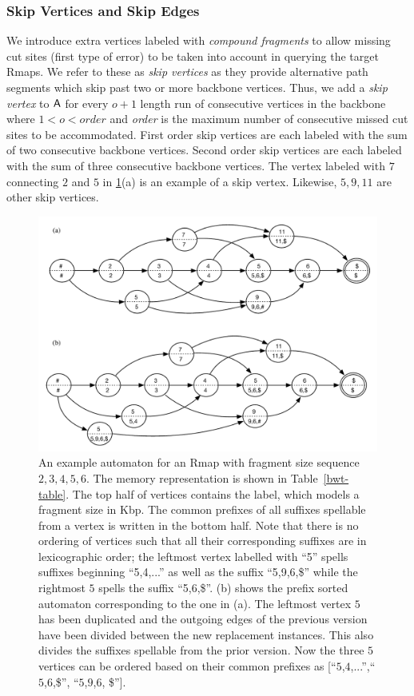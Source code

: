 \subsubsection{Skip Vertices and Skip Edges}
We introduce extra vertices labeled with {\em compound fragments} to allow missing cut sites (first type of error) to be taken into account in querying the target Rmaps.  We refer to these as {\em skip vertices} as they provide alternative path segments which skip past two or more backbone vertices. Thus, we add a {\em skip vertex} to $\mathsf{A}$ for every $o+1$ length run of consecutive vertices in the backbone where $1 < o < order$ and  \emph{order} is the maximum number of consecutive missed cut sites to be accommodated.  First order skip vertices are each labeled with the sum of two consecutive backbone vertices.  Second order skip vertices are each labeled with the sum of three consecutive backbone vertices. The vertex labeled with $7$ connecting $2$ and $5$ in \ref{fig:example}(a) is an example of a skip vertex.  Likewise, $5, 9, 11$ are other skip vertices.

\begin{figure}[h!] %
\includegraphics[width=\textwidth]{gcsa_paper/content/figures/example_combined}
\caption{An example automaton for an Rmap with fragment size sequence $2, 3, 4, 5, 6$.  The memory representation is shown in Table~\ref{bwt-table}. The top half of vertices contains the label, which models a fragment size in Kbp.  The common prefixes of all suffixes spellable from a vertex is written in the bottom half.  Note that there is no ordering of vertices such that all their corresponding suffixes are in lexicographic order;  the leftmost vertex labelled with ``5'' spells suffixes beginning ``5,4,...'' as well as the suffix ``5,9,6,\$'' while the rightmost $5$  spells the suffix ``5,6,\$''. (b) shows the prefix sorted automaton corresponding to the one in (a).  The leftmost vertex $5$ has been duplicated and the outgoing edges of the previous version have been divided between the new replacement instances.  This also divides the suffixes spellable from the prior version.  Now the three $5$ vertices can be ordered based on their common prefixes as [``$5$,$4$,...'',``$5$,$6$,\$'', ``$5$,$9$,$6$, \$'']. }
\label{fig:example}
\end{figure}




